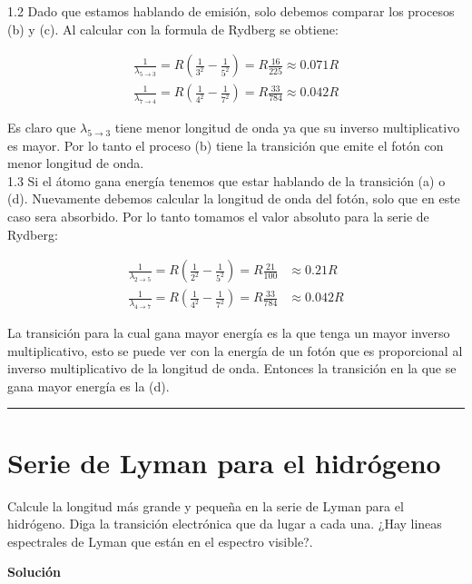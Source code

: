 \documentclass[12pt]{article}
\begin{document}
1.2 Dado que estamos hablando de emisión, solo debemos comparar los procesos (b) y (c). Al calcular con la formula de Rydberg se obtiene:

\begin{align*}
\frac{1}{\lambda_{5\rightarrow 3}} = R\left(\frac{1}{3^2}-\frac{1}{5^2}\right) = R\frac{16}{225}\approx 0.071 R\\
\frac{1}{\lambda_{7\rightarrow 4}} = R\left(\frac{1}{4^2}-\frac{1}{7^2}\right) = R\frac{33}{784}\approx 0.042R 
\end{align*}

Es claro que $\lambda_{5\rightarrow 3}$ tiene menor longitud de onda ya que su inverso multiplicativo es mayor. Por lo tanto el proceso (b) tiene la transición que emite el fotón con menor longitud de onda.\\

1.3 Si el átomo gana energía tenemos que estar hablando de la transición (a) o (d). Nuevamente debemos calcular la longitud de onda del fotón, solo que en este caso sera absorbido. Por lo tanto tomamos el valor absoluto para la serie de Rydberg:

\begin{align*}
\frac{1}{\lambda_{2\rightarrow 5}} = R\left(\frac{1}{2^2}-\frac{1}{5^2}\right) = R\frac{21}{100}&\approx 0.21 R\\
\frac{1}{\lambda_{4\rightarrow 7}} = R\left(\frac{1}{4^2}-\frac{1}{7^2}\right) = R\frac{33}{784}&\approx 0.042R 
\end{align*}
 
La transición para la cual gana mayor energía es la que tenga un mayor inverso multiplicativo, esto se puede ver con la energía de un fotón que es proporcional al inverso multiplicativo de la longitud de onda. Entonces la transición en la que se gana mayor energía es la (d).



\noindent\rule{16.5cm}{0.4pt}





\section{Serie de Lyman para el hidrógeno}

Calcule la longitud más grande y pequeña en la serie de Lyman para el hidrógeno. Diga la transición electrónica
que da lugar a cada una. ¿Hay lineas espectrales de Lyman que están en el espectro visible?.
	

\begin{center}
	\textbf{Solución}
\end{center}
\end{document}
